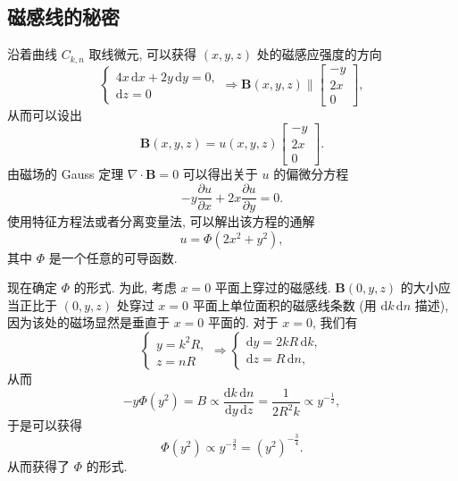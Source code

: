 \documentclass{article}
\newcounter{para}
\begin{document}
\subsection{磁感线的秘密}

沿着曲线 $C_{k,n}$ 取线微元, 可以获得 $\left(x,y,z\right)$ 处的磁感应强度的方向
\begin{equation}
	\begin{cases}4x\,\mathrm dx+2y\,\mathrm dy=0,\\\mathrm dz=0\end{cases}
	\Rightarrow\mathbf B\!\left(x,y,z\right)\parallel
	\left[\begin{matrix}-y\\2x\\0\end{matrix}\right],
\end{equation}
从而可以设出
\begin{equation}
	\mathbf B\!\left(x,y,z\right)=
	u\!\left(x,y,z\right)\left[\begin{matrix}-y\\2x\\0\end{matrix}\right].
\end{equation}
由磁场的 Gauss 定理 $\nabla\cdot\mathbf B=0$ 可以得出关于 $u$ 的偏微分方程
\begin{equation}
	-y\frac{\partial u}{\partial x}+2x\frac{\partial u}{\partial y}=0.
\end{equation}
使用特征方程法或者分离变量法, 可以解出该方程的通解
\begin{equation}
	u=\Phi\!\left(2x^2+y^2\right),
\end{equation}
其中 $\Phi$ 是一个任意的可导函数.

现在确定 $\Phi$ 的形式.
为此, 考虑 $x=0$ 平面上穿过的磁感线.
$\mathbf B\!\left(0,y,z\right)$ 的大小应当正比于
$\left(0,y,z\right)$ 处穿过 $x=0$ 平面上单位面积的磁感线条数
(用 $\mathrm dk\,\mathrm dn$ 描述),
因为该处的磁场显然是垂直于 $x=0$ 平面的.
对于 $x=0$, 我们有
\begin{equation}
	\begin{cases}y=k^2R,\\z=nR\end{cases}\Rightarrow
	\begin{cases}\mathrm dy=2kR\,\mathrm dk,\\\mathrm dz=R\,\mathrm dn,\end{cases}
\end{equation}
从而
\begin{equation}
	-y\Phi\!\left(y^2\right)=B\propto\frac{\mathrm dk\,\mathrm dn}{\mathrm dy\,\mathrm dz}
	=\frac1{2R^2k}\propto y^{-\frac12},
\end{equation}
于是可以获得
\begin{equation}
	\Phi\!\left(y^2\right)\propto y^{-\frac32}=\left(y^2\right)^{-\frac34}.
\end{equation}
从而获得了 $\Phi$ 的形式.
\end{document}
